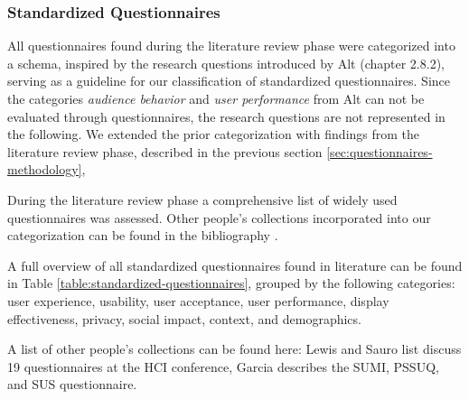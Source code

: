 




\subsubsection{Standardized Questionnaires}
\label{sec:questionnaires-categorization}



	All questionnaires found during the literature review phase were categorized into a schema, inspired by the research questions introduced by Alt \cite{alt2013thesis} (chapter 2.8.2), serving as a guideline for our classification of standardized questionnaires. Since the categories \textit{audience behavior} and \textit{user performance} from Alt can not be evaluated through questionnaires, the research questions are not represented in the following.
	We extended the prior categorization with findings from the literature review phase, described in the previous section \ref{sec:questionnaires-methodology}, 

	During the literature review phase a comprehensive list of widely used questionnaires was assessed. Other people's collections incorporated into our categorization can be found in the bibliography \cite{Lewis2013HCI, Garcia2013UXResearch, Geneve2014Wiki, Chur2014Questionnaires, wechsung2008evaluation}. 

	A full overview of all standardized questionnaires found in literature can be found in Table \ref{table:standardized-questionnaires}, grouped by the following categories: user experience, usability, user acceptance, user performance, display effectiveness, privacy, social impact, context, and demographics.


	A list of other people's collections can be found here: Lewis and Sauro \cite{Lewis2013HCI} list discuss 19 questionnaires at the HCI conference, Garcia \cite{Garcia2013UXResearch} describes the SUMI, PSSUQ, and SUS questionnaire.

